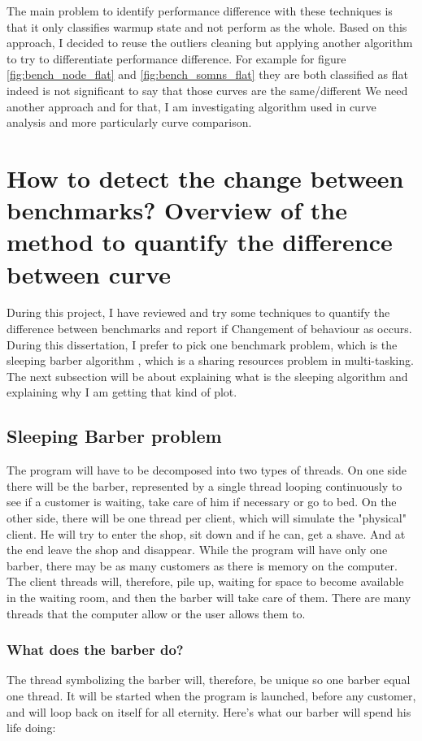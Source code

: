 \documentclass{article}
\begin{document}
The main problem to identify performance difference with these techniques is that it only classifies warmup state and not perform as the whole. Based on this approach, I decided to reuse the outliers cleaning but applying another algorithm to try to differentiate performance difference. For example for figure \ref{fig:bench_node_flat} and \ref{fig:bench_somns_flat} they are both classified as flat indeed is not significant to say that those curves are the same/different We need another approach and for that, I am investigating algorithm used in curve analysis and more particularly curve comparison.




\section{ How to detect the change between benchmarks? Overview of the method to quantify the difference between curve}

During this project, I have reviewed and try some techniques to quantify the difference between benchmarks and report if Changement of behaviour as occurs. During this dissertation, I prefer to pick one benchmark problem, which is the sleeping barber algorithm \cite{reynolds2002linda}, which is a sharing resources problem in multi-tasking. The next subsection will be about explaining what is the sleeping algorithm and explaining why I am getting that kind of plot.

\subsection{Sleeping Barber problem}

The program will have to be decomposed into two types of threads. On one side there will be the barber, represented by a single thread looping continuously to see if a customer is waiting, take care of him if necessary or go to bed. On the other side, there will be one thread per client, which will simulate the "physical" client. He will try to enter the shop, sit down and if he can, get a shave. And at the end leave the shop and disappear.
While the program will have only one barber, there may be as many customers as there is memory on the computer. The client threads will, therefore, pile up, waiting for space to become available in the waiting room, and then the barber will take care of them. There are many threads that the computer allow or the user allows them to.

\subsubsection{ What does the barber do?}
The thread symbolizing the barber will, therefore, be unique so one barber equal one thread. It will be started when the program is launched, before any customer, and will loop back on itself for all eternity.
Here's what our barber will spend his life doing:
\end{document}
